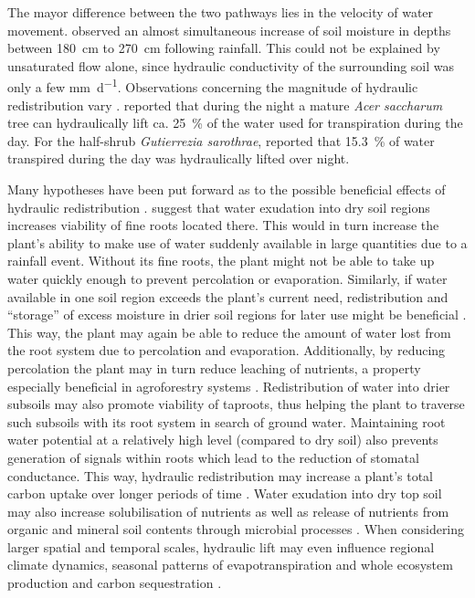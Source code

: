 The mayor difference between the two pathways lies in the velocity of water movement.  \textcite{burgess_tree_2001} observed an almost simultaneous increase of soil moisture in depths between \SI{180}{cm} to \SI{270}{cm} following rainfall.  This could not be explained by unsaturated flow alone, since hydraulic conductivity of the surrounding soil was only a few \si{\milli\metre\per\day}.  Observations concerning the magnitude of hydraulic redistribution vary \parencite{bayala_hydraulic_2008}.  \textcite{emerman_hydraulic_1996} reported that during the night a mature \emph{Acer saccharum} tree can hydraulically lift ca. \SI{25}{\percent} of the water used for transpiration during the day.  For the half-shrub \emph{Gutierrezia sarothrae}, \textcite{wan_does_1993} reported that \SI{15.3}{\percent} of water transpired during the day was hydraulically lifted over night.

Many hypotheses have been put forward as to the possible beneficial effects of hydraulic redistribution \parencite{caldwell_hydraulic_1998}.  \textcite{burgess_redistribution_1998} suggest that water exudation into dry soil regions increases viability of fine roots located there.  This would in turn increase the plant’s ability to make use of water suddenly available in large quantities due to a rainfall event.  Without its fine roots, the plant might not be able to take up water quickly enough to prevent percolation or evaporation.  Similarly, if water available in one soil region exceeds the plant’s current need, redistribution and ``storage'' of excess moisture in drier soil regions for later use might be beneficial \parencite{richards_hydraulic_1987}.  This way, the plant may again be able to reduce the amount of water lost from the root system due to percolation and evaporation.  Additionally, by reducing percolation the plant may in turn reduce leaching of nutrients, a property especially beneficial in agroforestry systems \parencite{burgess_redistribution_1998}.  Redistribution of water into drier subsoils may also promote viability of taproots, thus helping the plant to traverse such subsoils with its root system in search of ground water.  Maintaining root water potential at a relatively high level (compared to dry soil) also prevents generation of signals within roots which lead to the reduction of stomatal conductance.  This way, hydraulic redistribution may increase a plant’s total carbon uptake over longer periods of time \parencite{warren_hydraulic_2007}.  Water exudation into dry top soil may also increase solubilisation of nutrients as well as release of nutrients from organic and mineral soil contents through microbial processes \parencite{pate_assessing_1999,ryel_hydraulic_2002}.  When considering larger spatial and temporal scales, hydraulic lift may even influence regional climate dynamics, seasonal patterns of evapotranspiration and whole ecosystem production and carbon sequestration \parencite{warren_hydraulic_2007}.

